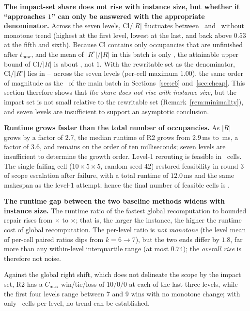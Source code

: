 \textbf{The impact-set share does not rise with instance size, but whether it ``approaches \(1\)'' can only be answered with the appropriate denominator.}
Across the seven levels, \(\mathrm{Cl}/|R|\) fluctuates between \ScaleCloLo\ and \ScaleCloHi\ without monotone trend
(highest at the first level, lowest at the last, and back above \(0.53\) at the fifth and sixth). Because \(\mathrm{Cl}\) contains only
occupancies that are unfinished after \(t_{\mathrm{now}}\), and the mean of \(|R^{\circ}|/|R|\) in this batch is only \ScaleAliveShare,
the attainable upper bound of \(\mathrm{Cl}/|R|\) is about \ScaleAliveShare, not \(1\). With the rewritable set as the denominator,
\(\mathrm{Cl}/|R^{\circ}|\) lies in \ScaleCloAliveLo--\ScaleCloAliveHi\ across the seven levels (per-cell maximum \(1.00\)),
the same order of magnitude as the \ClosureAliveFrac\ of the main batch in Sections~\ref{sec:e6} and~\ref{sec:cheap}.
This section therefore shows that \emph{the share does not rise with instance size}, but the impact set is not small relative to the rewritable set (Remark~\ref{rem:minimality}),
and seven levels are insufficient to support an asymptotic conclusion.

\textbf{Runtime grows faster than the total number of occupancies.} As \(|R|\) grows by a factor of \(2.7\), the median runtime of R2 grows from
\(2.9\)\,ms to \ScaleMsHi\,ms, a factor of \(3.6\), and remains on the order of ten milliseconds; seven levels are insufficient to determine the growth order. Level-1 rerouting is feasible in \ScaleFeasFirst\ cells.
The single failing cell (\(10\times5\times5\), random seed \(42\)) restored feasibility in round \(3\) of scope escalation after failure,
with a total runtime of \(12.0\)\,ms and the same makespan as the level-1 attempt; hence the final number of feasible cells is \ScaleFeasAll.

\textbf{The runtime gap between the two baseline methods widens with instance size.} The runtime ratio of the fastest global recomputation to bounded repair
rises from \ScaleRatioLo\(\times\) to \ScaleRatioHi\(\times\); that is, the larger the instance, the higher the runtime cost of global recomputation.
The per-level ratio is \emph{not monotone} (the level mean of per-cell paired ratios dips from \(k=6\to 7\)), but the two ends differ by \(1.8\),
far more than any within-level interquartile range (at most \(0.74\)); the \emph{overall rise} is therefore not noise.

Against the global right shift, which does not delineate the scope by the impact set, R2 has a \(C_{\max}\) win/tie/loss of \(10/0/0\) at each of the last three levels, while the first four levels
range between \(7\) and \(9\) wins with no monotone change; with only \NSeeds\ cells per level, no trend can be established.

